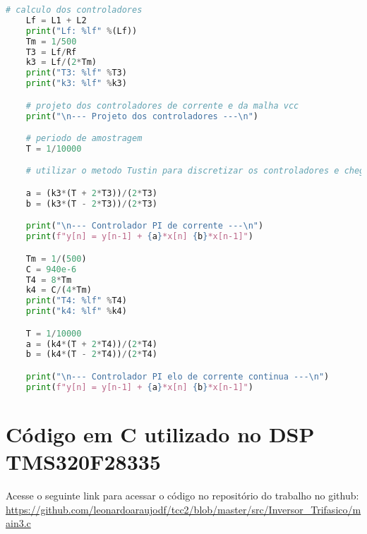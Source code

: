 \begin{anexosenv}
\begin{lstlisting}[language=Python,caption=Projeto do filtro LCL e controladores]
    # calculo dos controladores
    Lf = L1 + L2
    print("Lf: %lf" %(Lf))
    Tm = 1/500
    T3 = Lf/Rf
    k3 = Lf/(2*Tm)
    print("T3: %lf" %T3)
    print("k3: %lf" %k3)

    # projeto dos controladores de corrente e da malha vcc
    print("\n--- Projeto dos controladores ---\n")

    # periodo de amostragem
    T = 1/10000

    # utilizar o metodo Tustin para discretizar os controladores e chegar nas equacoes analiticas abaixo

    a = (k3*(T + 2*T3))/(2*T3)
    b = (k3*(T - 2*T3))/(2*T3)

    print("\n--- Controlador PI de corrente ---\n")
    print(f"y[n] = y[n-1] + {a}*x[n] {b}*x[n-1]")

    Tm = 1/(500)
    C = 940e-6
    T4 = 8*Tm
    k4 = C/(4*Tm)
    print("T4: %lf" %T4)
    print("k4: %lf" %k4)

    T = 1/10000
    a = (k4*(T + 2*T4))/(2*T4)
    b = (k4*(T - 2*T4))/(2*T4)

    print("\n--- Controlador PI elo de corrente continua ---\n")
    print(f"y[n] = y[n-1] + {a}*x[n] {b}*x[n-1]")

\end{lstlisting}

\chapter{Código em C utilizado no DSP TMS320F28335}

Acesse o seguinte link para acessar o código no repositório do trabalho no github: \url{https://github.com/leonardoaraujodf/tcc2/blob/master/src/Inversor_Trifasico/main3.c}

\end{anexosenv}

